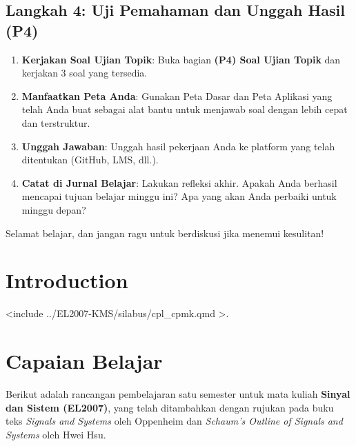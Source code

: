 \documentclass[
  letterpaper,
  DIV=11,
  numbers=noendperiod]{scrreprt}
\providecommand{\tightlist}{%
  \setlength{\itemsep}{0pt}\setlength{\parskip}{0pt}}
\begin{document}
\section*{\texorpdfstring{\textbf{Langkah 4: Uji Pemahaman dan Unggah
Hasil
(P4)}}{Langkah 4: Uji Pemahaman dan Unggah Hasil (P4)}}\label{langkah-4-uji-pemahaman-dan-unggah-hasil-p4}


\begin{enumerate}
\def\labelenumi{\arabic{enumi}.}
\tightlist
\item
  \textbf{Kerjakan Soal Ujian Topik}: Buka bagian \textbf{(P4) Soal
  Ujian Topik} dan kerjakan 3 soal yang tersedia.
\item
  \textbf{Manfaatkan Peta Anda}: Gunakan Peta Dasar dan Peta Aplikasi
  yang telah Anda buat sebagai alat bantu untuk menjawab soal dengan
  lebih cepat dan terstruktur.
\item
  \textbf{Unggah Jawaban}: Unggah hasil pekerjaan Anda ke platform yang
  telah ditentukan (GitHub, LMS, dll.).
\item
  \textbf{Catat di Jurnal Belajar}: Lakukan refleksi akhir. Apakah Anda
  berhasil mencapai tujuan belajar minggu ini? Apa yang akan Anda
  perbaiki untuk minggu depan?
\end{enumerate}

Selamat belajar, dan jangan ragu untuk berdiskusi jika menemui
kesulitan!


\chapter{Introduction}\label{introduction}

{{<include  ../EL2007-KMS/silabus/cpl_cpmk.qmd    >}}.


\chapter{Capaian Belajar}\label{capaian-belajar}

Berikut adalah rancangan pembelajaran satu semester untuk mata kuliah
\textbf{Sinyal dan Sistem (EL2007)}, yang telah ditambahkan dengan
rujukan pada buku teks \emph{Signals and Systems} oleh Oppenheim dan
\emph{Schaum's Outline of Signals and Systems} oleh Hwei Hsu.
\end{document}
